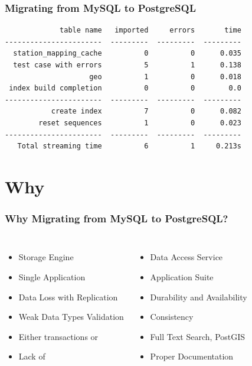 \documentclass{beamer}
\begin{document}
\begin{frame}[fragile]
  \frametitle{Migrating from MySQL to PostgreSQL}
  
  \vfill

\begin{verbatim}
             table name   imported     errors       time
-----------------------  ---------  ---------  ---------
  station_mapping_cache          0          0      0.035
  test case with errors          5          1      0.138
                    geo          1          0      0.018
 index build completion          0          0        0.0
-----------------------  ---------  ---------  ---------
           create index          7          0      0.082
        reset sequences          1          0      0.023
-----------------------  ---------  ---------  ---------
   Total streaming time          6          1     0.213s
\end{verbatim}
\end{frame}

\section{Why}

\begin{frame}[fragile]
  \frametitle{Why Migrating from MySQL to PostgreSQL?}
  
  \vfill

\begin{columns}[c]


  \begin{itemize}
  \item Storage Engine
  \item Single Application
  \item Data Loss with Replication
  \item Weak Data Types Validation
  \item Either transactions or
  \item Lack of
  \end{itemize}



  \begin{itemize}
  \item Data Access Service
  \item Application Suite
  \item Durability and Availability
  \item Consistency
  \item Full Text Search, PostGIS
  \item Proper Documentation
  \end{itemize}
\end{columns}
\end{frame}
\end{document}
